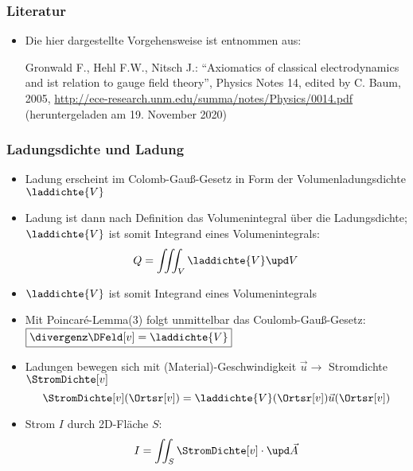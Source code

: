 \begin{frame}
  \frametitle{Literatur}
\begin{itemize}[<+->]
\item Die hier dargestellte Vorgehensweise ist entnommen aus:
  \bigskip
  
  Gronwald F., Hehl F.W., Nitsch J.: \enquote{Axiomatics of classical electrodynamics and ist relation to gauge field theory}, Physics Notes 14, edited by C. Baum, 2005, \url{http://ece-research.unm.edu/summa/notes/Physics/0014.pdf} (heruntergeladen am 19. November 2020)
\end{itemize}
\end{frame}


\begin{frame}
  \frametitle{Ladungsdichte und Ladung}
\begin{itemize}[<+->]
\item Ladung erscheint im Colomb-Gauß-Gesetz in Form der Volumenladungsdichte \(\laddichte{V} \)
\item Ladung ist dann nach Definition das Volumenintegral über die Ladungsdichte; \(\laddichte{V} \) ist somit Integrand eines Volumenintegrals:
  \begin{equation*}
    Q = \iiint_V \laddichte{V} \upd V
  \end{equation*}
\item<0> \(\laddichte{V} \) ist somit Integrand eines Volumenintegrals
  \item<0> Mit Poincaré-Lemma(3) folgt unmittelbar das Coulomb-Gauß-Gesetz: \( \boxed{\divergenz\DFeld[v] = \laddichte{V} }\)
  \item<0> Ladungen bewegen sich mit (Material)-Geschwindigkeit \(\vec{u} \to\) Stromdichte \(\StromDichte[v]\)
    \begin{equation*}
\StromDichte[v](\Ortsr[v]) = \laddichte{V}(\Ortsr[v])\vec{u}(\Ortsr[v])
\end{equation*}
\item<0> Strom \(I\) durch 2D-Fläche \(S\):
  \begin{equation*}
    I = \iint_S \StromDichte[v] \cdot \upd\vec{A}
    \end{equation*}

    
\end{itemize}
\end{frame}

